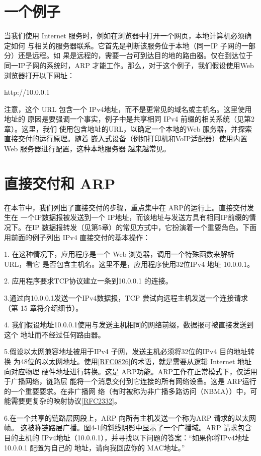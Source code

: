 \section{一个例子}

当我们使用 Internet 服务时，例如在浏览器中打开一个网页，本地计算机必须确定如何
与相关的服务器联系。它首先是判断该服务位于本地（同一IP 子网的一部分）还是远程。如
果是远程的，需要一台可到达目的地的路由器。仅在到达位于同一IP子网的系统时，ARP
才能工作。那么，对于这个例子，我们假设使用Web 浏览器打开以下网址：

http://10.0.0.1

注意，这个 URL 包含一个 IPv4地址，而不是更常见的域名或主机名。这里使用地址的
原因是要强调一个事实，例子中是共享相同 IPv4 前缀的相关系统（见第2章）。这里，我们
使用包含地址的URL，以确定一个本地的Web 服务器，并探索直接交付的运行原理。随着
嵌入式设备（例如打印机和VoIP适配器）使用内置Web 服务器进行配置，这种本地服务器
越来越常见。

\section{直接交付和 ARP}

在本节中，我们列出了直接交付的步骤，重点集中在 ARP的运行上。直接交付发生在
一个IP数据报被发送到一个 IP地址，而该地址与发送方具有相同IP前缀的情况下。在IP
数据报转发（见第5章）的常见方式中，它扮演着一个重要角色。下面用前面的例子列出
IPv4 直接交付的基本操作：

1. 在这种情况下，应用程序是一个 Web 浏览器，调用一个特殊函数来解析 URL，看它
是否包含主机名。这里不是，应用程序使用32位IPv4 地址 10.0.0.1。

2. 应用程序要求TCP协议建立一条到10.0.0.1 的连接。

3.通过向10.0.0.1发送一个IPv4数据报，TCP 尝试向远程主机发送一个连接请求（第
15 章将介绍细节）。

4. 我们假设地址10.0.0.1使用与发送主机相同的网络前缀，数据报可被直接发送到这个
地址而不经过任何路由器。

5.假设以太网兼容地址被用于IPv4 子网，发送主机必须将32位的IPv4 目的地址转换
为48位的以太网地址。使用\href{https://www.rfc-editor.org/rfc/rfc0826}{[RFC0826]}的术语，就是需要从逻辑 Internet 地址向对应物理
硬件地址进行转换。这是 ARP功能。ARP工作在正常模式下，仅适用于广播网络，链路层
能将一个消息交付到它连接的所有网络设备。这是 ARP运行的一个重要要求。在非广播网
络（有时被称为非广播多路访问（NBMA））中，可能需要更复杂的映射协议\href{https://www.rfc-editor.org/rfc/rfc2332}{[RFC2332]}。

6.在一个共享的链路层网段上，ARP 向所有主机发送一个称为ARP 请求的以太网帧。
这被称链路层广播。图4-1的斜线阴影中显示了一个广播域。ARP 请求包含目的主机的
IPv4地址（10.0.0.1），并寻找以下问题的答案：“如果你将IPv4地址10.0.0.1 配置为自己的
地址，请向我回应你的 MAC地址。”

